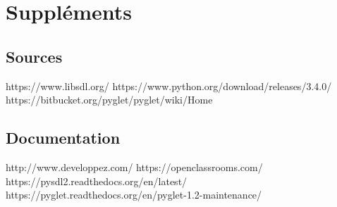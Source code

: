 \documentclass[a4paper, 12pt]{report}
\begin{document}
\chapter{Suppléments}
	\section{Sources}
https://www.libsdl.org/
https://www.python.org/download/releases/3.4.0/ \newline
https://bitbucket.org/pyglet/pyglet/wiki/Home

	\section{Documentation}
\noindent http://www.developpez.com/ \newline
https://openclassrooms.com/ \newline
https://pysdl2.readthedocs.org/en/latest/ \newline
https://pyglet.readthedocs.org/en/pyglet-1.2-maintenance/
\end{document}
